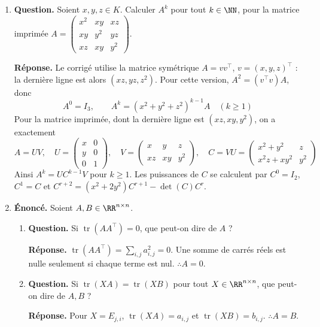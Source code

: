 \documentclass[12pt, a4paper]{article}
\begin{document}
\begin{enumerate}[label=4.\arabic*., start=60]
  \item \begin{minipage}[t]{\linewidth}\raggedright
\textbf{Question.} Soient $x,y,z\in K$. Calculer $A^k$ pour tout $k\in\NN$, pour la matrice imprimée $\displaystyle A=\begin{pmatrix}x^2&xy&xz\\xy&y^2&yz\\xz&xy&y^2\end{pmatrix}$.
\par\smallskip
\textbf{Réponse.} Le corrigé utilise la matrice symétrique $A=vv^\top$, $v=(x,y,z)^\top$ : la dernière ligne est alors $(xz,yz,z^2)$.
    Pour cette version, $A^2=(v^\top v)A$, donc
    \[
      A^0=I_3,\qquad A^k=(x^2+y^2+z^2)^{k-1}A\quad(k\geq1)
    \]
    Pour la matrice imprimée, dont la dernière ligne est $(xz,xy,y^2)$, on a exactement
    \[
      A=UV,\quad U=\begin{pmatrix}x&0\\y&0\\0&1\end{pmatrix},\quad
      V=\begin{pmatrix}x&y&z\\xz&xy&y^2\end{pmatrix},\quad
      C=VU=\begin{pmatrix}x^2+y^2&z\\x^2z+xy^2&y^2\end{pmatrix}
    \]
    Ainsi $A^k=UC^{k-1}V$ pour $k\geq1$.
    Les puissances de $C$ se calculent par $C^0=I_2$, $C^1=C$ et
    $C^{r+2}=(x^2+2y^2)C^{r+1}-\det(C)C^r$.
\end{minipage}

  \item \begin{minipage}[t]{\linewidth}\raggedright
\textbf{Énoncé.} Soient $A,B\in\RR^{n\times n}$.

\begin{enumerate}[\arabic*.]
        \item \textbf{Question.} Si $\operatorname{tr}(AA^\top)=0$, que peut-on dire de $A$ ?
\par\smallskip
\textbf{Réponse.} $\operatorname{tr}(AA^\top)=\sum_{i,j}a_{i,j}^2=0$.
        Une somme de carrés réels est nulle seulement si chaque terme est nul. $\therefore A=0$.

  \item \textbf{Question.} Si $\operatorname{tr}(XA)=\operatorname{tr}(XB)$ pour tout $X\in\RR^{n\times n}$, que peut-on dire de $A,B$ ?
\par\smallskip
\textbf{Réponse.} Pour $X=E_{j,i}$, $\operatorname{tr}(XA)=a_{i,j}$ et $\operatorname{tr}(XB)=b_{i,j}$.
        $\therefore A=B$.


\end{enumerate}
\end{minipage}
\end{enumerate}
\end{document}
